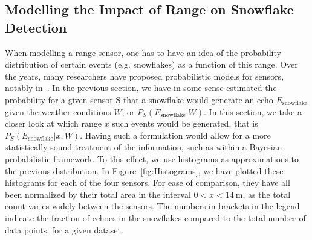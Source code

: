 \subsection{Modelling the Impact of Range on Snowflake Detection}
When modelling a range sensor, one has to have an idea of the probability distribution of certain events (e.g. snowflakes) as a function of this range. Over the years, many researchers have proposed probabilistic models for sensors, notably in~\cite{Thrun:2005:PR:1121596}. In the previous section, we have in some sense estimated the probability for a given sensor S that a snowflake would generate an echo $E_\text{snowflake}$ given the weather conditions $W$, or $P_S(E_\text{snowflake}|W)$. In this section, we take a closer look at which range $x$ such events would be generated, that is $P_S(E_\text{snowflake}|x,W)$. Having such a formulation would allow for a more statistically-sound treatment of the information, such as within a Bayesian probabilistic framework. To this effect, we use histograms as approximations to the previous distribution. In Figure~\ref{fig:Histograms}, we have plotted these histograms for each of the four sensors. For ease of comparison, they have all been normalized by their total area in the interval $0 < x < \SI{14}{\meter}$, as the total count varies widely between the sensors. The numbers in brackets in the legend indicate the fraction of echoes in the snowflakes compared to the total number of data points, for a given dataset.


